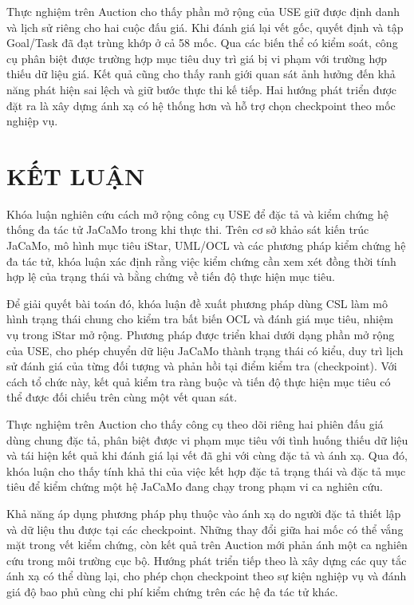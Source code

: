 \documentclass[12pt,a4paper,oneside]{extreport}
\begin{document}
Thực nghiệm trên Auction cho thấy phần mở rộng của USE giữ được định danh và lịch sử riêng cho hai cuộc đấu giá. Khi đánh giá lại vết gốc, quyết định và tập Goal/Task đã đạt trùng khớp ở cả 58 mốc. Qua các biến thể có kiểm soát, công cụ phân biệt được trường hợp mục tiêu duy trì giá bị vi phạm với trường hợp thiếu dữ liệu giá. Kết quả cũng cho thấy ranh giới quan sát ảnh hưởng đến khả năng phát hiện sai lệch và giữ bước thực thi kế tiếp. Hai hướng phát triển được đặt ra là xây dựng ánh xạ có hệ thống hơn và hỗ trợ chọn checkpoint theo mốc nghiệp vụ.

\chapter*{KẾT LUẬN}\label{ket-luan}

Khóa luận nghiên cứu cách mở rộng công cụ USE để đặc tả và kiểm chứng hệ thống đa tác tử JaCaMo trong khi thực thi. Trên cơ sở khảo sát kiến trúc JaCaMo, mô hình mục tiêu iStar, UML/OCL và các phương pháp kiểm chứng hệ đa tác tử, khóa luận xác định rằng việc kiểm chứng cần xem xét đồng thời tính hợp lệ của trạng thái và bằng chứng về tiến độ thực hiện mục tiêu.

Để giải quyết bài toán đó, khóa luận đề xuất phương pháp dùng CSL làm mô hình trạng thái chung cho kiểm tra bất biến OCL và đánh giá mục tiêu, nhiệm vụ trong iStar mở rộng. Phương pháp được triển khai dưới dạng phần mở rộng của USE, cho phép chuyển dữ liệu JaCaMo thành trạng thái có kiểu, duy trì lịch sử đánh giá của từng đối tượng và phản hồi tại điểm kiểm tra (checkpoint). Với cách tổ chức này, kết quả kiểm tra ràng buộc và tiến độ thực hiện mục tiêu có thể được đối chiếu trên cùng một vết quan sát.

Thực nghiệm trên Auction cho thấy công cụ theo dõi riêng hai phiên đấu giá dùng chung đặc tả, phân biệt được vi phạm mục tiêu với tình huống thiếu dữ liệu và tái hiện kết quả khi đánh giá lại vết đã ghi với cùng đặc tả và ánh xạ. Qua đó, khóa luận cho thấy tính khả thi của việc kết hợp đặc tả trạng thái và đặc tả mục tiêu để kiểm chứng một hệ JaCaMo đang chạy trong phạm vi ca nghiên cứu.

Khả năng áp dụng phương pháp phụ thuộc vào ánh xạ do người đặc tả thiết lập và dữ liệu thu được tại các checkpoint. Những thay đổi giữa hai mốc có thể vắng mặt trong vết kiểm chứng, còn kết quả trên Auction mới phản ánh một ca nghiên cứu trong môi trường cục bộ. Hướng phát triển tiếp theo là xây dựng các quy tắc ánh xạ có thể dùng lại, cho phép chọn checkpoint theo sự kiện nghiệp vụ và đánh giá độ bao phủ cùng chi phí kiểm chứng trên các hệ đa tác tử khác.
\end{document}
